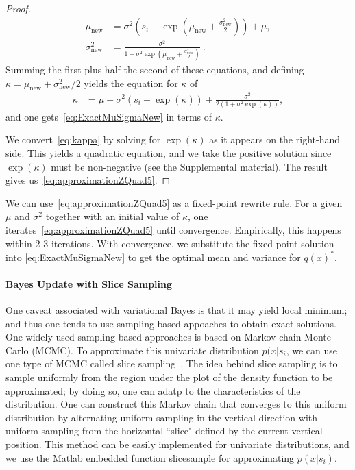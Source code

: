 \begin{proof}
%
\begin{align}
    \mu_{\text{new}} & = \sigma^{2}\left(s_i - \exp\left(\mu_{\text{new}}+\frac{\sigma_{\text{new}}^2}{2}\right)\right) + \mu, \nonumber \\
   \sigma_{\text{new}}^2 & = \frac{\sigma^2}{1+\sigma^2 \exp(\mu_{\text{new}}+\frac{\sigma_{new}^2}{2})}~.\nonumber
\end{align}
Summing the first plus half the second of these equations,
and defining $\kappa=\mu_{\text{new}}+\sigma_{\text{new}}^2/2$
yields the equation for $\kappa$ of
\begin{align}\label{eq:kappa}
    \kappa & = \mu + \sigma^2(s_i - \exp(\kappa)) + \frac{\sigma^2}{2(1+\sigma^2\exp(\kappa))},
\end{align}
and one gets~\eqref{eq:ExactMuSigmaNew} in terms of $\kappa$.

We convert~\eqref{eq:kappa} by solving for $\exp(\kappa)$
as it appears on the right-hand side.  This yields
a quadratic equation, and we take the positive solution since $\exp(\kappa)$
must be non-negative (see the Supplemental material).
The result gives us~\eqref{eq:approximationZQuad5}.
\end{proof}

We can use~\eqref{eq:approximationZQuad5}
as a fixed-point rewrite rule.
For a given $\mu$ and $\sigma^2$ together with an initial value of
$\kappa$, one iterates~\eqref{eq:approximationZQuad5} until
convergence.  Empirically, this happens within 2-3 iterations.
With convergence, we substitute the fixed-point solution
into \eqref{eq:ExactMuSigmaNew} to get the optimal mean
and variance for $q(x)^*$.

\paragraph{\bf Bayes Update with Slice Sampling}
One caveat associated with variational Bayes is that it may yield local minimum; and thus one tends to use sampling-based appoaches to obtain exact solutions. One widely used sampling-based approaches is based on Markov chain Monte Carlo (MCMC). To approximate this univariate distribution $p(x|s_i$, we can use one type of MCMC called slice sampling~\cite{neal03SliceSampling}. The idea behind slice sampling is to sample uniformly from the region under the plot of the density function to be approximated; by doing so, one can adatp to the characteristics of the distribution. One can construct this Markov chain that converges to this uniform distribution by alternating uniform sampling in the vertical direction with uniform sampling from the horizontal ``slice" defined by the current vertical position. This method can be easily implemented for univariate distributions, and we use the Matlab embedded function slicesample for approximating $p(x|s_i)$. 

